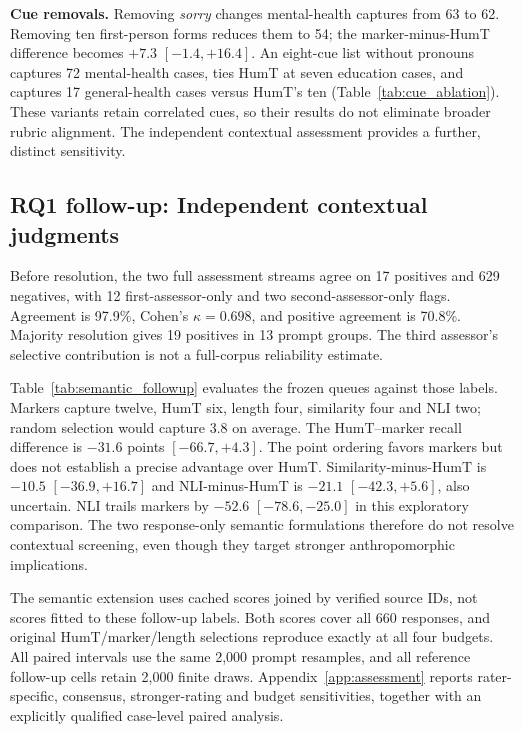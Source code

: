 \textbf{Cue removals.} Removing \emph{sorry} changes mental-health captures from 63 to 62. Removing ten first-person forms reduces them to 54; the marker-minus-HumT difference becomes $+7.3$ $[-1.4,+16.4]$. An eight-cue list without pronouns captures 72 mental-health cases, ties HumT at seven education cases, and captures 17 general-health cases versus HumT's ten (Table~\ref{tab:cue_ablation}). These variants retain correlated cues, so their results do not eliminate broader rubric alignment. The independent contextual assessment provides a further, distinct sensitivity.

\subsection{RQ1 follow-up: Independent contextual judgments}\label{sec:assessmentresults}
Before resolution, the two full assessment streams agree on 17 positives and 629 negatives, with 12 first-assessor-only and two second-assessor-only flags. Agreement is 97.9\%, Cohen's $\kappa=0.698$, and positive agreement is 70.8\%. Majority resolution gives 19 positives in 13 prompt groups. The third assessor's selective contribution is not a full-corpus reliability estimate.

Table~\ref{tab:semantic_followup} evaluates the frozen queues against those labels. Markers capture twelve, HumT six, length four, similarity four and NLI two; random selection would capture 3.8 on average. The HumT--marker recall difference is $-31.6$ points $[-66.7,+4.3]$. The point ordering favors markers but does not establish a precise advantage over HumT. Similarity-minus-HumT is $-10.5$ $[-36.9,+16.7]$ and NLI-minus-HumT is $-21.1$ $[-42.3,+5.6]$, also uncertain. NLI trails markers by $-52.6$ $[-78.6,-25.0]$ in this exploratory comparison. The two response-only semantic formulations therefore do not resolve contextual screening, even though they target stronger anthropomorphic implications.


The semantic extension uses cached scores joined by verified source IDs, not scores fitted to these follow-up labels. Both scores cover all 660 responses, and original HumT/marker/length selections reproduce exactly at all four budgets. All paired intervals use the same 2,000 prompt resamples, and all reference follow-up cells retain 2,000 finite draws. Appendix~\ref{app:assessment} reports rater-specific, consensus, stronger-rating and budget sensitivities, together with an explicitly qualified case-level paired analysis.

